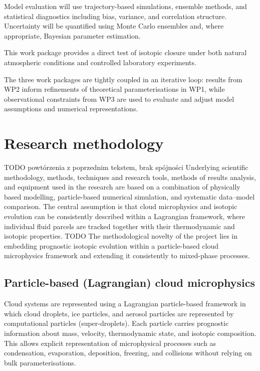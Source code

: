 \documentclass[12pt]{article}
\begin{document}
Model evaluation will use trajectory-based simulations, ensemble methods,
and statistical diagnostics including bias, variance, and correlation structure.
Uncertainty will be quantified using Monte Carlo ensembles and, where appropriate, Bayesian parameter estimation.

This work package provides a direct test of isotopic closure under both natural atmospheric conditions
and controlled laboratory experiments.

The three work packages are tightly coupled in an iterative loop:
results from WP2 inform refinements of theoretical parameterisations in WP1,
while observational constraints from WP3 are used to evaluate and adjust
model assumptions and numerical representations.





\section{Research methodology}
{\color{red} TODO powtórzenia z poprzednim tekstem, brak spójności}
Underlying scientific methodology, methods, techniques and research tools,
methods of results analysis, and equipment used in the research are based 
on a combination of physically based modelling, particle-based numerical simulation,
and systematic data--model comparison. 
The central assumption is that cloud microphysics and isotopic evolution can be consistently 
described within a Lagrangian framework, where individual fluid parcels are tracked together
with their thermodynamic and isotopic properties. TODO
The methodological novelty of the project lies in embedding prognostic isotopic evolution
within a particle-based cloud microphysics framework and extending it consistently to mixed-phase processes.

\subsection*{Particle-based (Lagrangian) cloud microphysics}
Cloud systems are represented using a Lagrangian particle-based framework in which cloud droplets,
ice particles, and aerosol particles are represented by computational particles (super-droplets).
Each particle carries prognostic information about mass, velocity, thermodynamic state, and isotopic composition.
This allows explicit representation of microphysical processes such as condensation, evaporation, deposition,
freezing, and collisions without relying on bulk parameterisations.
\end{document}
